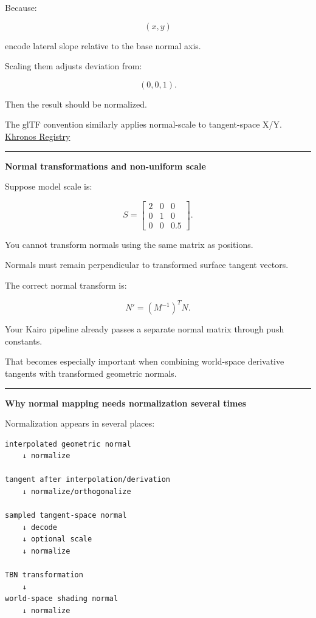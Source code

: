 Because:

\[
(x,y)
\]

encode lateral slope relative to the base normal axis.

Scaling them adjusts deviation from:

\[
(0,0,1).
\]

Then the result should be normalized.

The glTF convention similarly applies normal-scale to tangent-space X/Y. \href{https://registry.khronos.org/glTF/specs/2.0/glTF-2.0.html?utm_source=chatgpt.com}{Khronos Registry}

\begin{center}\rule{0.5\linewidth}{0.5pt}\end{center}

\textbf{Normal transformations and non-uniform scale}

Suppose model scale is:

\[
S=
\begin{bmatrix}
2&0&0\\
0&1&0\\
0&0&0.5
\end{bmatrix}.
\]

You cannot transform normals using the same matrix as positions.

Normals must remain perpendicular to transformed surface tangent vectors.

The correct normal transform is:

\[
\boxed{
N'
=
(M^{-1})^T N.
}
\]

Your Kairo pipeline already passes a separate normal matrix through push constants.

That becomes especially important when combining world-space derivative tangents with transformed geometric normals.

\begin{center}\rule{0.5\linewidth}{0.5pt}\end{center}

\textbf{Why normal mapping needs normalization several times}

Normalization appears in several places:

\begin{verbatim}
interpolated geometric normal
    ↓ normalize

tangent after interpolation/derivation
    ↓ normalize/orthogonalize

sampled tangent-space normal
    ↓ decode
    ↓ optional scale
    ↓ normalize

TBN transformation
    ↓
world-space shading normal
    ↓ normalize
\end{verbatim}


